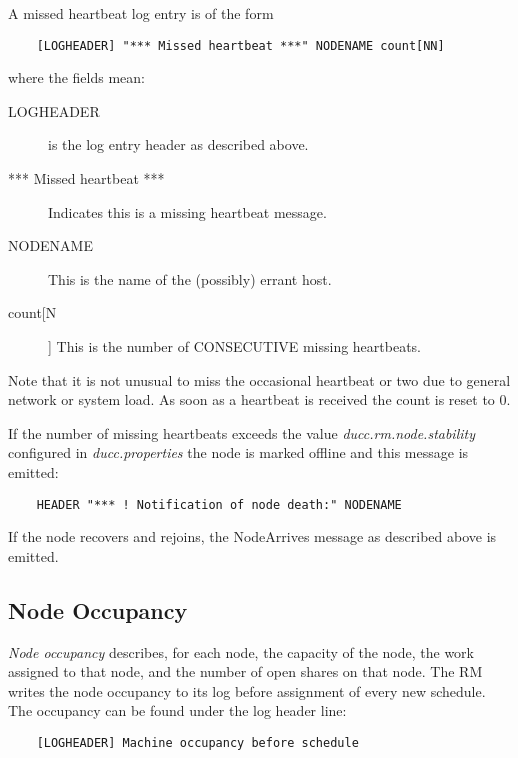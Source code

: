     A missed heartbeat log entry is of the form
\begin{verbatim}
    [LOGHEADER] "*** Missed heartbeat ***" NODENAME count[NN]
\end{verbatim}
    where the fields mean:
    \begin{description}
      \item[LOGHEADER] is the log entry header as described above.
      \item[*** Missed heartbeat ***] Indicates this is a missing heartbeat message.
      \item[NODENAME] This is the name of the (possibly) errant host.
      \item[count[N]] This is the number of CONSECUTIVE missing heartbeats.
    \end{description}

    Note that it is not unusual to miss the occasional heartbeat or two due to general network or system load.
    As soon as a heartbeat is received the count is reset to 0.

    If the number of missing heartbeats exceeds the value {\em ducc.rm.node.stability} configured in
    {\em ducc.properties} the node is marked offline and this message is emitted:
\begin{verbatim}
    HEADER "*** ! Notification of node death:" NODENAME
\end{verbatim}

    If the node recovers and rejoins, the NodeArrives message as described above is emitted.

\subsection{Node Occupancy}
    {\em Node occupancy} describes, for each node, the capacity of the node, the work assigned to
    that node, and the number of open shares on that node.  The RM writes the node occupancy 
    to its log before assignment of every new schedule.  The occupancy can be found under the log header line:
\begin{verbatim}
    [LOGHEADER] Machine occupancy before schedule
\end{verbatim}


